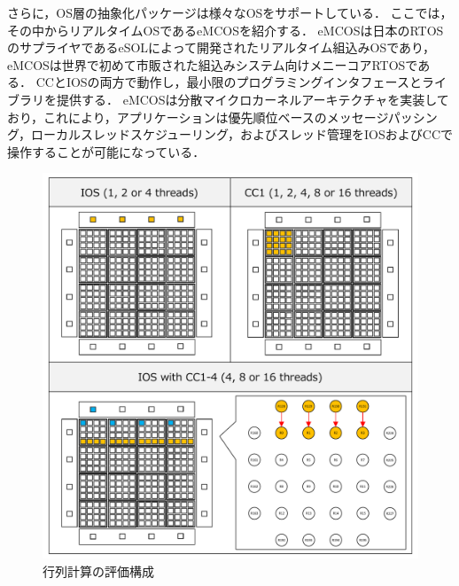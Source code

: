 \documentclass[submit,techrep]{ipsj_v2/UTF8/ipsj}
\begin{document}
さらに，OS層の抽象化パッケージは様々なOSをサポートしている．
ここでは，その中からリアルタイムOSであるeMCOSを紹介する．
eMCOSは日本のRTOSのサプライヤであるeSOLによって開発されたリアルタイム組込みOSであり，eMCOSは世界で初めて市販された組込みシステム向けメニーコアRTOSである．
CCとIOSの両方で動作し，最小限のプログラミングインタフェースとライブラリを提供する．
eMCOSは分散マイクロカーネルアーキテクチャを実装しており，これにより，アプリケーションは優先順位ベースのメッセージパッシング，ローカルスレッドスケジューリング，およびスレッド管理をIOSおよびCCで操作することが可能になっている．




\begin{figure}[t]
  \centering
  \includegraphics[width=0.8\linewidth]{../figure/matrix_calculation.pdf}
  \caption{\label{fig:mat_calc}
    行列計算の評価構成}
\end{figure}
\end{document}
